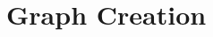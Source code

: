\documentclass[letterpaper,10pt,english]{sphinxmanual}
\begin{document}
\begin{DUlineblock}{0em}
\item[] 
\end{DUlineblock}

{\hyperref[\detokenize{index:mastertoc}]{}}


\chapter{Graph Creation}
\label{\detokenize{graph:graph-creation}}\label{\detokenize{graph::doc}}
\begin{DUlineblock}{0em}
\item[] 
\end{DUlineblock}
\end{document}
